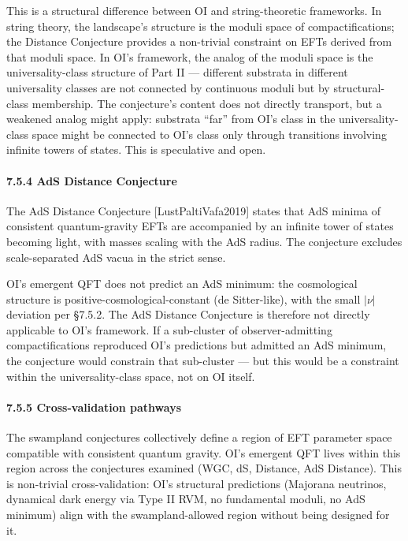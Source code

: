 \documentclass[
]{article}
\begin{document}
This is a structural difference between OI and string-theoretic
frameworks. In string theory, the landscape's structure is the moduli
space of compactifications; the Distance Conjecture provides a
non-trivial constraint on EFTs derived from that moduli space. In OI's
framework, the analog of the moduli space is the universality-class
structure of Part II --- different substrata in different universality
classes are not connected by continuous moduli but by structural-class
membership. The conjecture's content does not directly transport, but a
weakened analog might apply: substrata ``far'' from OI's class in the
universality-class space might be connected to OI's class only through
transitions involving infinite towers of states. This is speculative and
open.

\hypertarget{ads-distance-conjecture}{%
\paragraph{7.5.4 AdS Distance
Conjecture}\label{ads-distance-conjecture}}

The AdS Distance Conjecture {[}LustPaltiVafa2019{]} states that AdS
minima of consistent quantum-gravity EFTs are accompanied by an infinite
tower of states becoming light, with masses scaling with the AdS radius.
The conjecture excludes scale-separated AdS vacua in the strict sense.

OI's emergent QFT does not predict an AdS minimum: the cosmological
structure is positive-cosmological-constant (de Sitter-like), with the
small \(|\nu|\) deviation per §7.5.2. The AdS Distance Conjecture is
therefore not directly applicable to OI's framework. If a sub-cluster of
observer-admitting compactifications reproduced OI's predictions but
admitted an AdS minimum, the conjecture would constrain that sub-cluster
--- but this would be a constraint within the universality-class space,
not on OI itself.

\hypertarget{cross-validation-pathways}{%
\paragraph{7.5.5 Cross-validation
pathways}\label{cross-validation-pathways}}

The swampland conjectures collectively define a region of EFT parameter
space compatible with consistent quantum gravity. OI's emergent QFT
lives within this region across the conjectures examined (WGC, dS,
Distance, AdS Distance). This is non-trivial cross-validation: OI's
structural predictions (Majorana neutrinos, dynamical dark energy via
Type II RVM, no fundamental moduli, no AdS minimum) align with the
swampland-allowed region without being designed for it.
\end{document}
